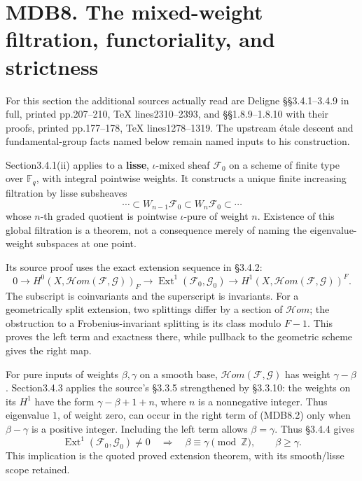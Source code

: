\documentclass[
]{report}
\begin{document}
\section{MDB8. The mixed-weight filtration, functoriality, and
strictness}\label{mdb8.-the-mixed-weight-filtration-functoriality-and-strictness}

For this section the additional sources actually read are Deligne
§§3.4.1--3.4.9 in full, printed pp.207--210, TeX lines2310--2393, and
§§1.8.9--1.8.10 with their proofs, printed pp.177--178, TeX
lines1278--1319. The upstream étale descent and fundamental-group facts
named below remain named inputs to his construction.

Section3.4.1(ii) applies to a \textbf{lisse}, \(\iota\)-mixed sheaf
\(\mathcal F_0\) on a scheme of finite type over \(\mathbb F_q\), with
integral pointwise weights. It constructs a unique finite increasing
filtration by lisse subsheaves \[
\cdots\subset W_{n-1}\mathcal F_0
\subset W_n\mathcal F_0\subset\cdots
\tag{MDB8.1}
\] whose \(n\)-th graded quotient is pointwise \(\iota\)-pure of weight
\(n\). Existence of this global filtration is a theorem, not a
consequence merely of naming the eigenvalue-weight subspaces at one
point.

Its source proof uses the exact extension sequence in §3.4.2: \[
0\longrightarrow
H^0(X,\mathcal Hom(\mathcal F,\mathcal G))_F
\longrightarrow
\operatorname{Ext}^1(\mathcal F_0,\mathcal G_0)
\longrightarrow
H^1(X,\mathcal Hom(\mathcal F,\mathcal G))^F.
\tag{MDB8.2}
\] The subscript is coinvariants and the superscript is invariants. For
a geometrically split extension, two splittings differ by a section of
\(\mathcal Hom\); the obstruction to a Frobenius-invariant splitting is
its class modulo \(F-1\). This proves the left term and exactness there,
while pullback to the geometric scheme gives the right map.

For pure inputs of weights \(\beta,\gamma\) on a smooth base,
\(\mathcal Hom(\mathcal F,\mathcal G)\) has weight \(\gamma-\beta\).
Section3.4.3 applies the source's §3.3.5 strengthened by §3.3.10: the
weights on its \(H^1\) have the form \(\gamma-\beta+1+n\), where \(n\)
is a nonnegative integer. Thus eigenvalue \(1\), of weight zero, can
occur in the right term of (MDB8.2) only when \(\beta-\gamma\) is a
positive integer. Including the left term allows \(\beta=\gamma\). Thus
§3.4.4 gives \[
\operatorname{Ext}^1(\mathcal F_0,\mathcal G_0)\neq0
\quad\Longrightarrow\quad
\beta\equiv\gamma\pmod{\mathbb Z},\qquad \beta\geq\gamma.
\tag{MDB8.3}
\] This implication is the quoted proved extension theorem, with its
smooth/lisse scope retained.
\end{document}

